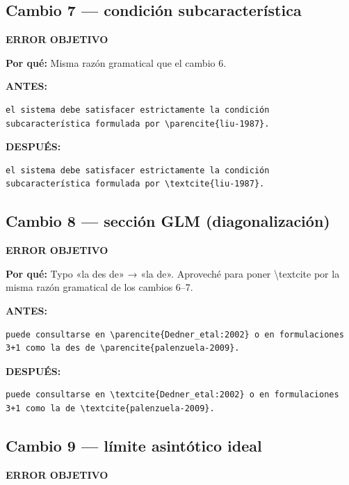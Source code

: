 \documentclass[11pt,a4paper]{article}
\begin{document}
\subsection*{Cambio 7 --- condición subcaracterística}
\colorbox{okbg}{\textbf{\footnotesize ERROR OBJETIVO}}

\textbf{Por qué:} Misma razón gramatical que el cambio 6.

\textcolor{antesline}{\textbf{ANTES:}}
\begin{Verbatim}[breaklines=true, breakanywhere=true, fontsize=\small, frame=leftline, rulecolor=\color{antesline}, framerule=1.2pt]
el sistema debe satisfacer estrictamente la condición subcaracterística formulada por \parencite{liu-1987}.
\end{Verbatim}
\textcolor{despline}{\textbf{DESPUÉS:}}
\begin{Verbatim}[breaklines=true, breakanywhere=true, fontsize=\small, frame=leftline, rulecolor=\color{despline}, framerule=1.2pt]
el sistema debe satisfacer estrictamente la condición subcaracterística formulada por \textcite{liu-1987}.
\end{Verbatim}

\subsection*{Cambio 8 --- sección GLM (diagonalización)}
\colorbox{okbg}{\textbf{\footnotesize ERROR OBJETIVO}}

\textbf{Por qué:} Typo «la des de» → «la de». Aproveché para poner \textbackslash{}textcite por la misma razón gramatical de los cambios 6--7.

\textcolor{antesline}{\textbf{ANTES:}}
\begin{Verbatim}[breaklines=true, breakanywhere=true, fontsize=\small, frame=leftline, rulecolor=\color{antesline}, framerule=1.2pt]
puede consultarse en \parencite{Dedner_etal:2002} o en formulaciones 3+1 como la des de \parencite{palenzuela-2009}.
\end{Verbatim}
\textcolor{despline}{\textbf{DESPUÉS:}}
\begin{Verbatim}[breaklines=true, breakanywhere=true, fontsize=\small, frame=leftline, rulecolor=\color{despline}, framerule=1.2pt]
puede consultarse en \textcite{Dedner_etal:2002} o en formulaciones 3+1 como la de \textcite{palenzuela-2009}.
\end{Verbatim}

\subsection*{Cambio 9 --- límite asintótico ideal}
\colorbox{okbg}{\textbf{\footnotesize ERROR OBJETIVO}}
\end{document}
